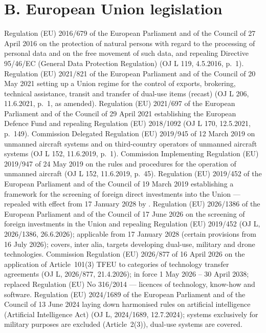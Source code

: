 \section*{B. European Union legislation}
\begin{BibList}
 Regulation (EU) 2016/679 of the European Parliament and of the Council of 27 April 2016 on the protection of natural persons with regard to the processing of personal data and on the free movement of such data, and repealing Directive 95/46/EC (General Data Protection Regulation) (OJ L 119, 4.5.2016, p.~1).
 Regulation (EU) 2021/821 of the European Parliament and of the Council of 20 May 2021 setting up a Union regime for the control of exports, brokering, technical assistance, transit and transfer of dual-use items (recast) (OJ L 206, 11.6.2021, p.~1, as amended).
 Regulation (EU) 2021/697 of the European Parliament and of the Council of 29 April 2021 establishing the European Defence Fund and repealing Regulation (EU) 2018/1092 (OJ L 170, 12.5.2021, p.~149).
 Commission Delegated Regulation (EU) 2019/945 of 12 March 2019 on unmanned aircraft systems and on third-country operators of unmanned aircraft systems (OJ L 152, 11.6.2019, p.~1).
 Commission Implementing Regulation (EU) 2019/947 of 24 May 2019 on the rules and procedures for the operation of unmanned aircraft (OJ L 152, 11.6.2019, p.~45).
 Regulation (EU) 2019/452 of the European Parliament and of the Council of 19 March 2019 establishing a framework for the screening of foreign direct investments into the Union --- repealed with effect from 17 January 2028 by .
 Regulation (EU) 2026/1386 of the European Parliament and of the Council of 17 June 2026 on the screening of foreign investments in the Union and repealing Regulation (EU) 2019/452 (OJ L, 2026/1386, 26.6.2026); applicable from 17 January 2028 (certain provisions from 16 July 2026); covers, inter alia, targets developing dual-use, military and drone technologies.
 Commission Regulation (EU) 2026/877 of 16 April 2026 on the application of Article~101(3) TFEU to categories of technology transfer agreements (OJ L, 2026/877, 21.4.2026); in force 1 May 2026 -- 30 April 2038; replaced Regulation (EU) No 316/2014 --- licences of technology, know-how and software.
 Regulation (EU) 2024/1689 of the European Parliament and of the Council of 13 June 2024 laying down harmonised rules on artificial intelligence (Artificial Intelligence Act) (OJ L, 2024/1689, 12.7.2024); systems exclusively for military purposes are excluded (Article~2(3)), dual-use systems are covered.

\end{BibList}
